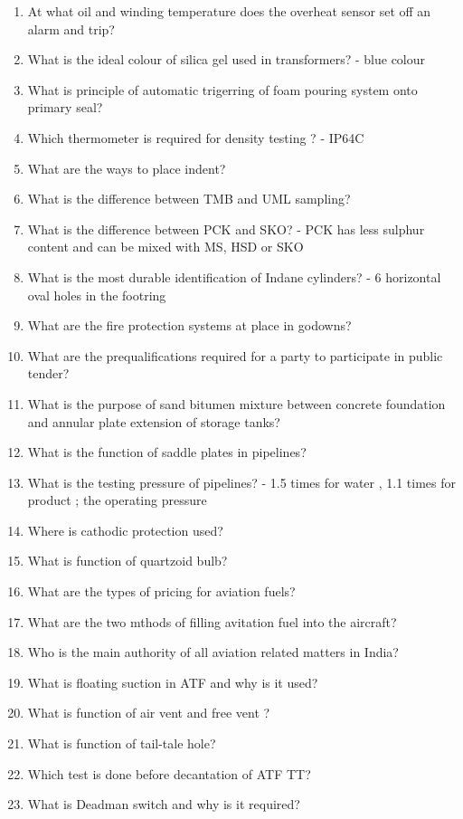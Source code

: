 \documentclass{report}
\begin{document}
\begin{enumerate}
		\item At what oil and winding temperature does the overheat sensor set off an alarm and trip?
		\item What is the ideal colour of silica gel used in transformers? - blue colour
		\item What is principle of automatic trigerring of foam pouring system onto primary seal? 
		\item Which thermometer is required for density testing ? - IP64C
		\item What are the ways to place indent?
		\item What is the difference between TMB and UML sampling?
		\item What is the difference between PCK and SKO? - PCK has less sulphur content and can be mixed with MS, HSD or SKO
		\item What is the most durable identification of Indane cylinders? - 6 horizontal oval holes in the footring
		\item What are the fire protection systems at place in godowns?
		\item What are the prequalifications required for a party to participate in public tender?
		\item What is the purpose of sand bitumen mixture between concrete foundation and annular plate extension of storage tanks?
		\item What is the function of saddle plates in pipelines?
		\item What is the testing pressure of pipelines? - 1.5 times for water , 1.1 times for product ; the operating pressure
		\item Where is cathodic protection used?
		\item What is function of quartzoid bulb?
		\item What are the types of pricing for aviation fuels?
		\item What are the two mthods of filling avitation fuel into the aircraft?
		\item Who is the main authority of all aviation related matters in India?
		\item What is floating suction in ATF and why is it used?
		\item What is function of air vent and free vent ?
		\item What is function of tail-tale hole?
		\item Which test is done before decantation of ATF TT?
		\item What is Deadman switch and why is it required?

\end{enumerate}
\end{document}
